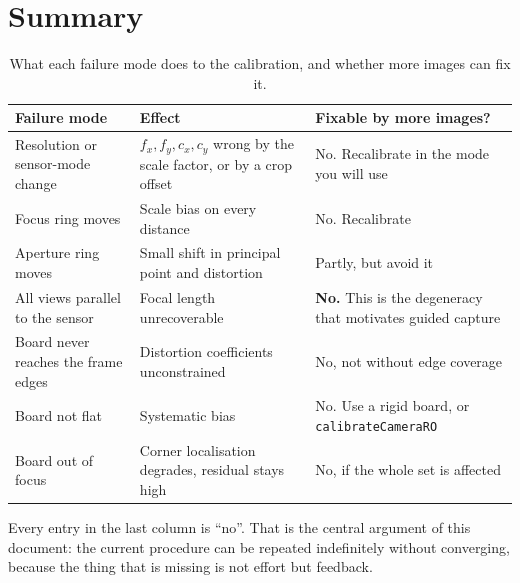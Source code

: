 \section{Summary}

\begin{table}[!ht]
\centering
\small
\caption[Failure modes and their effect]{What each failure mode does to the calibration, and whether more images can fix it.}
\label{tab:failures}
\begin{tabularx}{\textwidth}{p{} p{} X}
\toprule
\textbf{Failure mode} & \textbf{Effect} & \textbf{Fixable by more images?} \\
\midrule
Resolution or sensor-mode change & $f_x, f_y, c_x, c_y$ wrong by the scale factor, or by a crop offset & No. Recalibrate in the mode you will use \\
Focus ring moves & Scale bias on every distance & No. Recalibrate \\
Aperture ring moves & Small shift in principal point and distortion & Partly, but avoid it \\
All views parallel to the sensor & Focal length unrecoverable & \textbf{No.} This is the degeneracy that motivates guided capture \\
Board never reaches the frame edges & Distortion coefficients unconstrained & No, not without edge coverage \\
Board not flat & Systematic bias & No. Use a rigid board, or \texttt{calibrateCameraRO} \\
Board out of focus & Corner localisation degrades, residual stays high & No, if the whole set is affected \\
\bottomrule
\end{tabularx}
\end{table}

Every entry in the last column is ``no''. That is the central argument of this document: the current procedure can be repeated indefinitely without converging, because the thing that is missing is not effort but feedback.
